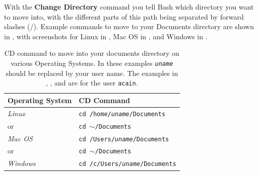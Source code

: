 With the \textbf{Change Directory} command you tell Bash which directory you want to move into, with the different parts of this path being separated by forward slashes (/). Example commands to move to your Documents directory are shown in , with screenshots for Linux in , Mac OS in , and Windows in .

\begin{table}[h]
  \centering
  \begin{tabular}{|l|l|}
  \hline
  \textbf{Operating System} & \textbf{CD Command}  \\
  \hline
  \emph{Linux} & \texttt{cd /home/\emph{uname}/Documents} \\
  or & \texttt{cd $\sim$/Documents} \\
  \hline
  \emph{Mac OS} & \texttt{cd /Users/\emph{uname}/Documents} \\
  or & \texttt{cd $\sim$/Documents} \\
  \hline
  \emph{Windows} & \texttt{cd /c/Users/\emph{uname}/Documents} \\
  \hline
\end{tabular}
  \caption{CD command to move into your documents directory on various Operating Systems. In these examples \texttt{\emph{uname}} should be replaced by your user name. The examples in , , and  are for the user \texttt{acain}.}
  \label{tbl:dirs}
\end{table}


